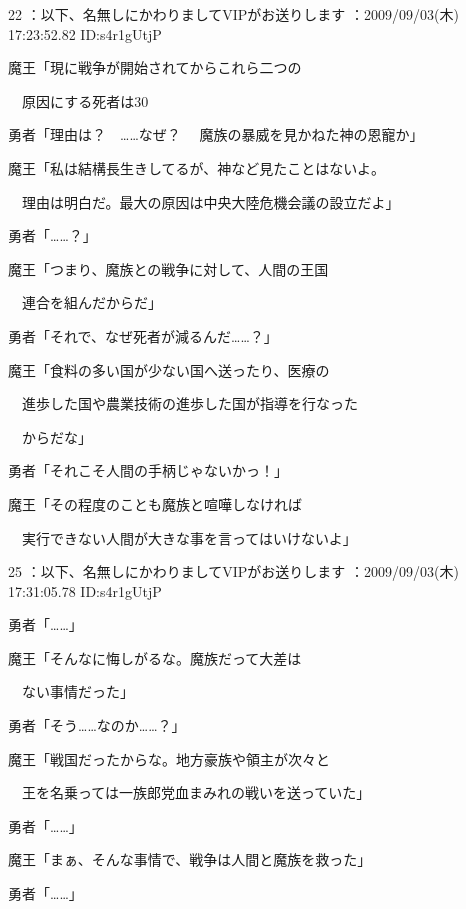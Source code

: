 \documentclass[a4j,twocolumn]{tarticle}
\begin{document}
22 ：以下、名無しにかわりましてVIPがお送りします ：2009/09/03(木) 17:23:52.82 ID:s4r1gUtjP 


魔王「現に戦争が開始されてからこれら二つの\par{}
　原因にする死者は30%



勇者「理由は？　……なぜ？ 
　魔族の暴威を見かねた神の恩寵か」 



魔王「私は結構長生きしてるが、神など見たことはないよ。\par{} 
　理由は明白だ。最大の原因は中央大陸危機会議の設立だよ」 



勇者「……？」 



魔王「つまり、魔族との戦争に対して、人間の王国\par{}
　連合を組んだからだ」\par{} 
勇者「それで、なぜ死者が減るんだ……？」 



魔王「食料の多い国が少ない国へ送ったり、医療の\par{} 
　進歩した国や農業技術の進歩した国が指導を行なった\par{} 
　からだな」 



勇者「それこそ人間の手柄じゃないかっ！」 



魔王「その程度のことも魔族と喧嘩しなければ\par{} 
　実行できない人間が大きな事を言ってはいけないよ」
 

	

	

25 ：以下、名無しにかわりましてVIPがお送りします ：2009/09/03(木) 17:31:05.78 ID:s4r1gUtjP 


勇者「……」\par{} 
魔王「そんなに悔しがるな。魔族だって大差は\par{} 
　ない事情だった」\par{} 
勇者「そう……なのか……？」 



魔王「戦国だったからな。地方豪族や領主が次々と\par{} 
　王を名乗っては一族郎党血まみれの戦いを送っていた」\par{} 
勇者「……」 



魔王「まぁ、そんな事情で、戦争は人間と魔族を救った」\par{} 
勇者「……」 
\end{document}
